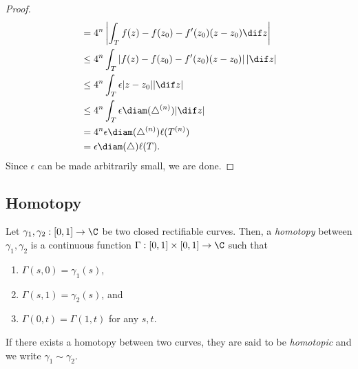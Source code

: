 \begin{proof}
\begin{align*}
					&= 4^n \left| \int_T f(z) - f(z_0) - f'(z_0) (z-z_0) \dif z \right| \\
					&\le 4^n \int_T \left| f(z) - f(z_0) - f'(z_0) (z-z_0) \right| |{\dif} z| \\
					&\le 4^n \int_T \epsilon |z-z_0| |{\dif} z| \\
					&\le 4^n \int_T \epsilon \diam(\triangle^{(n)}) |{\dif} z| \\
					&= 4^n \epsilon \diam(\triangle^{(n)}) \ell(T^{(n)}) \\
					&= \epsilon \diam(\triangle) \ell(T).
			\end{align*} 
			Since $\epsilon$ can be made arbitrarily small, we are done.
		\end{proof}

	\subsection{Homotopy}

		\begin{fdef}
			Let $\gamma_1,\gamma_2:[0,1] \to \C$ be two closed rectifiable curves. Then, a \emph{homotopy} between $\gamma_1,\gamma_2$ is a continuous function $\Gamma:[0,1]\times[0,1] \to \C$ such that
			\begin{enumerate}
				\item $\Gamma(s,0) = \gamma_1(s)$,
				\item $\Gamma(s,1) = \gamma_2(s)$, and
				\item $\Gamma(0,t) = \Gamma(1,t)$ for any $s,t$.
			\end{enumerate}
			If there exists a homotopy between two curves, they are said to be \emph{homotopic} and we write $\gamma_1 \sim \gamma_2$.
		\end{fdef}


